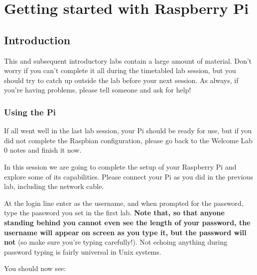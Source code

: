  \chapter{Getting started with Raspberry Pi}

 \minitoc



\section{Introduction}

 This and subsequent introductory labs contain a large amount of material. Don't worry if you can't complete it all during the timetabled lab session, but you should try to catch up outside the lab before your next session. As always, if you're having problems, please tell someone and ask for help!

\subsection{Using the Pi}
\label{sec:using-pi}

If all went well in the last lab session, your Pi should be ready for use, but if you did not complete the Raspbian configuration, please go back to the Welcome Lab 0 notes and finish it now.

In this session we are going to complete the setup of your Raspberry Pi and explore some of its capabilities. Please connect your Pi as you did in the previous lab, including the network cable.

At the login line enter  as the username, and when prompted for the password, type the password you set in the first lab. \textbf{Note that, so that anyone standing behind you cannot even see the length of your password,  the username will appear on screen as you type it, but the password will not} (so make sure you're typing carefully!). Not echoing anything during password typing is fairly universal in Unix systems.

You should now see:



